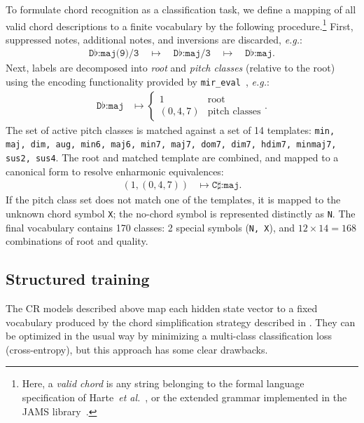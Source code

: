 \documentclass{article}
\def\eg{\emph{e.g.\/}}
\begin{document}
To formulate chord recognition as a classification task, we define a mapping of all valid chord descriptions to a finite vocabulary by the following procedure.\footnote{Here, a \emph{valid chord} is any string belonging to the formal language specification of Harte~\emph{et al.}~\cite{harte2005symbolic}, or the extended grammar implemented in the JAMS library~\cite{humphrey2014jams}.}
First, suppressed notes, additional notes, and inversions are discarded, \eg:
\begin{align*}
    \texttt{D}\flat\texttt{:maj(9)/3} 
    \quad\mapsto\quad \texttt{D}\flat\texttt{:maj/3}
    \quad\mapsto\quad \texttt{D}\flat\texttt{:maj}.
\end{align*}
Next, labels are decomposed into \emph{root} and \emph{pitch classes} (relative to the root) using the encoding functionality provided by \texttt{mir\_eval}~\cite{raffel2014mir_eval}, \eg:
\begin{align*}
    \texttt{D}\flat\texttt{:maj} &\mapsto \begin{cases}
        1 & \text{root}\\
        (0, 4, 7) & \text{pitch classes}
    \end{cases}.
\end{align*}
The set of active pitch classes is matched against a set of 14 templates: \texttt{min, maj, dim, aug, min6, maj6, min7, maj7, dom7, dim7, hdim7, minmaj7, sus2, sus4}.
The root and matched template are combined, and mapped to a canonical form to resolve enharmonic equivalences:
\begin{align*}
    \left(1, (0, 4, 7) \right) &\mapsto \texttt{C}\sharp\texttt{:maj}.
\end{align*}
If the pitch class set does not match one of the templates, it is mapped to the unknown chord symbol \texttt{X}; the no-chord symbol is represented distinctly as \texttt{N}.
The final vocabulary contains 170 classes: 2 special symbols (\texttt{N, X}), and $12\times14=168$ combinations of root and quality.


\subsection{Structured training}
\label{sec:encoding}

The CR models described above map each hidden state vector to a fixed vocabulary produced by the chord simplification strategy described in .
They can be optimized in the usual way by minimizing a multi-class classification loss (cross-entropy), but this approach has some clear drawbacks.
\end{document}

